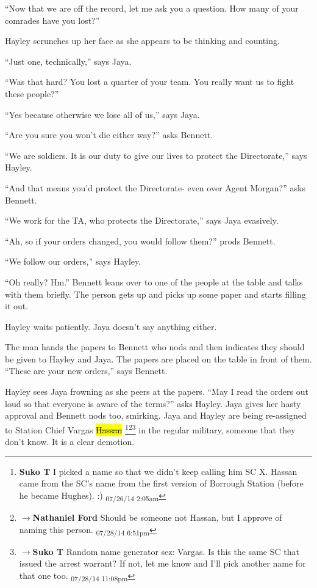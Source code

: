 ``Now that we are off the record, let me ask you a question.  How many of your comrades have you lost?''

Hayley scrunches up her face as she appears to be thinking and counting.

``Just one, technically,'' says Jaya.

``Was that hard?  You lost a quarter of your team.  You really want us to fight these people?''

``Yes because otherwise we lose all of us,'' says Jaya.

``Are you sure you won't die either way?'' asks Bennett.

``We are soldiers.  It is our duty to give our lives to protect the Directorate,'' says Hayley.

``And that means you'd protect the Directorate- even over Agent Morgan?'' asks Bennett.

``We work for the TA, who protects the Directorate,'' says Jaya evasively.

``Ah, so if your orders changed, you would follow them?'' prods Bennett.

``We follow our orders,'' says Hayley.

``Oh really?  Hm.''  Bennett leans over to one of the people at the table and talks with them briefly.  The person gets up and picks up some paper and starts filling it out.

Hayley waits patiently. Jaya doesn't say anything either.



The man hands the papers to Bennett who nods and then indicates they should be given to Hayley and Jaya.  The papers are placed on the table in front of them.  ``These are your new orders,'' says Bennett.

Hayley sees Jaya frowning as she peers at the papers.  ``May I read the orders out loud so that everyone is aware of the terms?'' asks Hayley.  Jaya gives her hasty approval and Bennett nods too, smirking.  Jaya and Hayley are being re-assigned to Station Chief Vargas\sout{ \hl{Hassan} }\footnote{\textbf{Suko T }I picked a name so that we didn't keep calling him SC X.  Hassan came from the SC's name from the first version of Borrough Station (before he became Hughes). :) \textsubscript{07/26/14 2:05am}}\footnote{$\rightarrow$\textbf{Nathaniel Ford }Should be someone not Hassan, but I approve of naming this person. \textsubscript{07/28/14 6:51pm}}\footnote{$\rightarrow$\textbf{Suko T }Random name generator sez: Vargas.  Is this the same SC that issued the arrest warrant?  If not, let me know and I'll pick another name for that one too. \textsubscript{07/28/14 11:08pm}} in the regular military, someone that they don't know.  It is a clear demotion.

